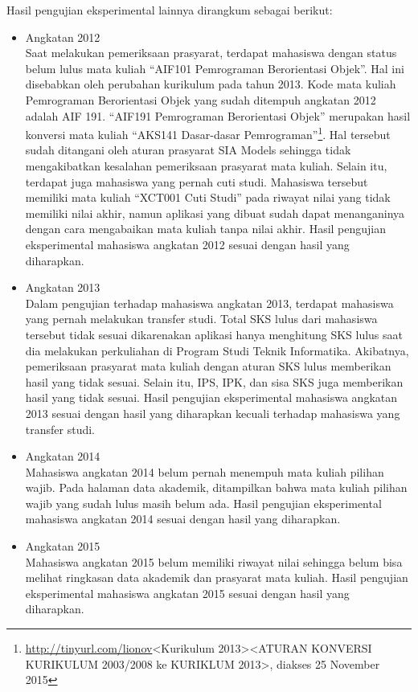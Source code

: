 		Hasil pengujian eksperimental lainnya dirangkum sebagai berikut:
		\begin{itemize}
			\item Angkatan 2012\\
			Saat melakukan pemeriksaan prasyarat, terdapat mahasiswa dengan status belum lulus mata kuliah ``AIF101 Pemrograman Berorientasi Objek''. Hal ini disebabkan oleh perubahan kurikulum pada tahun 2013. Kode mata kuliah Pemrograman Berorientasi Objek yang sudah ditempuh angkatan 2012 adalah AIF 191. ``AIF191 Pemrograman Berorientasi Objek'' merupakan hasil konversi mata kuliah ``AKS141 Dasar-dasar Pemrograman''\footnote{\url{http://tinyurl.com/lionov}<Kurikulum 2013><ATURAN KONVERSI 
KURIKULUM 2003/2008 ke KURIKLUM 2013>, diakses 25 November 2015}. Hal tersebut sudah ditangani oleh aturan prasyarat SIA Models sehingga tidak mengakibatkan kesalahan pemeriksaan prasyarat mata kuliah. Selain itu, terdapat juga mahasiswa yang pernah cuti studi. Mahasiswa tersebut memiliki mata kuliah ``XCT001 Cuti Studi'' pada riwayat nilai yang tidak memiliki nilai akhir, namun aplikasi yang dibuat sudah dapat menanganinya dengan cara mengabaikan mata kuliah tanpa nilai akhir. Hasil pengujian eksperimental mahasiswa angkatan 2012 sesuai dengan hasil yang diharapkan.
			\item Angkatan 2013\\
			Dalam pengujian terhadap mahasiswa angkatan 2013, terdapat mahasiswa yang pernah melakukan transfer studi. Total SKS lulus dari mahasiswa tersebut tidak sesuai dikarenakan aplikasi hanya menghitung SKS lulus saat dia melakukan perkuliahan di Program Studi Teknik Informatika. Akibatnya, pemeriksaan prasyarat mata kuliah dengan aturan SKS lulus memberikan hasil yang tidak sesuai. Selain itu, IPS, IPK, dan sisa SKS juga memberikan hasil yang tidak sesuai. Hasil pengujian eksperimental mahasiswa angkatan 2013 sesuai dengan hasil yang diharapkan kecuali terhadap mahasiswa yang transfer studi.
			\item Angkatan 2014\\
			Mahasiswa angkatan 2014 belum pernah menempuh mata kuliah pilihan wajib. Pada halaman data akademik, ditampilkan bahwa mata kuliah pilihan wajib yang sudah lulus masih belum ada. Hasil pengujian eksperimental mahasiswa angkatan 2014 sesuai dengan hasil yang diharapkan.
			\item Angkatan 2015\\
			Mahasiswa angkatan 2015 belum memiliki riwayat nilai sehingga belum bisa melihat ringkasan data akademik dan prasyarat mata kuliah. Hasil pengujian eksperimental mahasiswa angkatan 2015 sesuai dengan hasil yang diharapkan.
		\end{itemize}
		